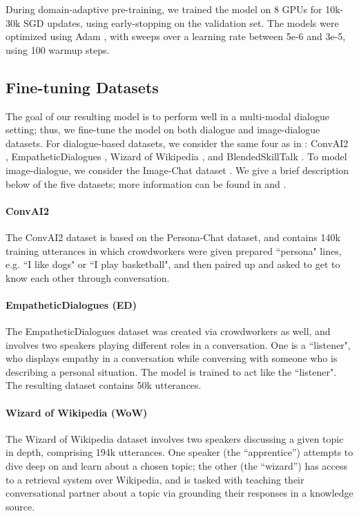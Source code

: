 \documentclass[11pt,a4paper]{article}
\begin{document}
During domain-adaptive pre-training, we trained the model on 8 
GPUs for 10k-30k SGD updates, using early-stopping on the validation set. The models were optimized using Adam \cite{kingma2014adam}, with sweeps over a learning rate between 5e-6 and 3e-5, using 100 warmup steps.

\subsection{Fine-tuning Datasets}
\label{sec:fine-tune-datasets}
The goal of our resulting model is to perform well in a multi-modal dialogue setting; thus, we fine-tune the model on both dialogue and image-dialogue datasets. For dialogue-based datasets, we consider the same four as in \citet{roller2020recipes}: ConvAI2 \cite{dinan2019second}, EmpatheticDialogues \cite{rashkin2019empathetic}, Wizard of Wikipedia \cite{dinan2018wizard}, and BlendedSkillTalk  \cite{smith2020bst}. To model image-dialogue, we consider the Image-Chat dataset \cite{shuster2020image}. We give a brief description below of the five datasets; more information can be found in \citet{roller2020recipes} and \citet{shuster2020image}.

\paragraph{ConvAI2}
The ConvAI2 dataset \cite{dinan2019second} is based on the Persona-Chat \cite{zhang2018personalizing} dataset, and contains 140k training utterances in which crowdworkers were given prepared ``persona" lines, e.g. ``I like dogs" or ``I play basketball", and then paired up and asked to get to know each other through conversation.
\paragraph{EmpatheticDialogues (ED)} The EmpatheticDialogues dataset \cite{rashkin2019empathetic} was created via crowdworkers as well, and involves two speakers playing different roles in a conversation. One is a ``listener", who displays empathy in a conversation while conversing with someone who is describing a personal situation. The model is trained to act like the ``listener". The resulting dataset contains 50k utterances.
\paragraph{Wizard of Wikipedia (WoW)} The Wizard of Wikipedia dataset \cite{dinan2018wizard} involves two speakers discussing a given topic in depth, comprising 194k utterances. One speaker (the ``apprentice'') attempts to dive deep on and learn about a chosen topic; the other (the ``wizard'') has access to a retrieval system over Wikipedia, and is tasked with teaching their conversational partner about a topic via grounding their responses in a knowledge source. 
\end{document}
